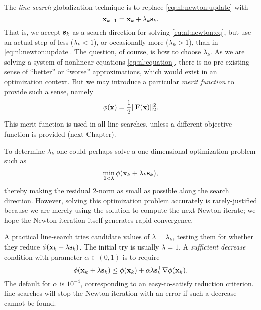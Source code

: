 The \emph{line search} globalization technique \citep{DennisSchnabel1983} is to replace \eqref{eq:nl:newton:update} with
\begin{equation}
\mathbf{x}_{k+1} = \mathbf{x}_k + \lambda_k \mathbf{s}_k.  \label{eq:nl:linesearchupdate}
\end{equation}
That is, we accept $\mathbf{s}_k$ as a search direction for solving \eqref{eq:nl:newton:eq}, but use an actual step of less ($\lambda_k < 1$), or occasionally more ($\lambda_k > 1$), than in \eqref{eq:nl:newton:update}.  The question, of course, is how to choose $\lambda_k$.  As we are solving a system of nonlinear equations \eqref{eq:nl:equation}, there is no pre-existing sense of ``better'' or ``worse'' approximations, which would exist in an optimization context.  But we may introduce a particular \emph{merit function} \citep{NocedalWright2006} to provide such a sense, namely
\begin{equation}
\phi(\mathbf{x}) = \frac{1}{2} \|\mathbf{F}(\mathbf{x})\|_2^2.  \label{eq:nl:linesearchmeritfunction}
\end{equation}
This merit function is used in all \pSNES line searches, unless a different objective function is provided (next Chapter).

To determine $\lambda_k$ one could perhaps solve a one-dimensional optimization problem such as
\begin{equation}
\min_{0<\lambda} \phi(\mathbf{x}_k + \lambda_k \mathbf{s}_k),  \label{eq:nl:linesearchperhapsopt}
\end{equation}
thereby making the residual 2-norm as small as possible along the search direction.  However, solving this optimization problem accurately is rarely-justified because we are merely using the solution to compute the next Newton iterate; we hope the Newton iteration itself generates rapid convergence.

A practical line-search tries candidate values of $\lambda=\lambda_k$, testing them for whether they reduce $\phi(\mathbf{x}_k + \lambda \mathbf{s}_k)$.  The initial try is usually $\lambda=1$.  A \emph{sufficient  decrease} condition with parameter $\alpha\in(0,1)$ is to require
\begin{equation}
\phi(\mathbf{x}_k + \lambda \mathbf{s}_k) \le \phi(\mathbf{x}_k) + \alpha \lambda \mathbf{s}_k^\top \nabla \phi(\mathbf{x}_k).  \label{eq:nl:linesearchsuffdecrease}
\end{equation}
The \PETSc default for $\alpha$ is $10^{-4}$, corresponding to an easy-to-satisfy reduction criterion.  \PETSc line searches will stop the Newton iteration with an error if such a decrease cannot be found.

